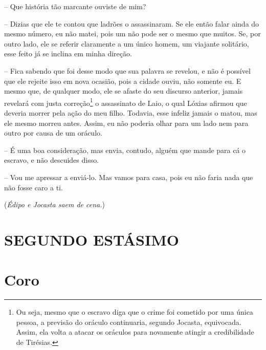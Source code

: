  --   Que história tão marcante ouviste de mim?

 --   Dizias que ele te contou que ladrões o assassinaram. Se ele então falar
ainda do mesmo número, eu não matei, pois um não pode ser o mesmo que
muitos. Se, por outro lado, ele se referir claramente a um único homem,
um viajante solitário, esse feito já se inclina em minha direção.

 --   Fica sabendo que foi desse modo que sua palavra se revelou, e não é
possível  que ele rejeite isso em nova ocasião, pois a cidade
ouviu, não somente eu. E mesmo que, de qualquer modo, ele se afaste do
seu discurso anterior, jamais revelará com justa correção\footnote{Ou
  seja, mesmo que o escravo diga que o crime foi cometido por uma única
  pessoa, a previsão do oráculo continuaria, segundo Jocasta,
  equivocada. Assim, ela volta a atacar os oráculos para novamente
  atingir a credibilidade de Tirésias.} o assassinato de Laio, o qual
Lóxias afirmou que deveria morrer pela ação do meu filho. Todavia, esse
infeliz jamais o matou, mas ele mesmo morreu antes. Assim, eu não
poderia olhar para um lado nem para outro por causa de um oráculo.

 --   É uma boa consideração, mas envia, contudo, alguém que mande para cá o
 escravo, e não descuides disso.

 --   Vou me apressar a enviá-lo. Mas vamos para casa, pois eu não faria nada
que não fosse caro a ti.

(\emph{Édipo e Jocasta saem de cena.})

\section{SEGUNDO ESTÁSIMO}


\section{Coro} 

